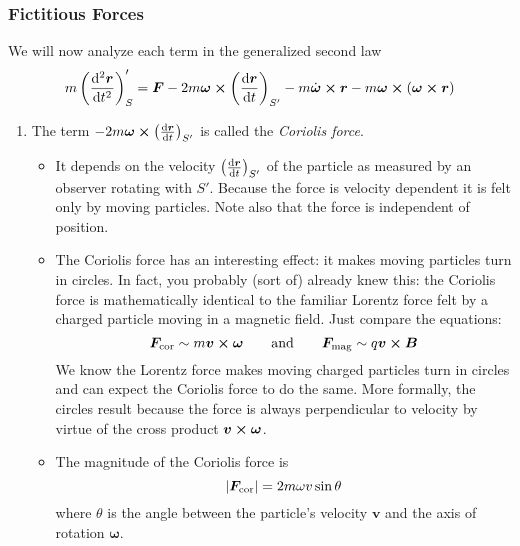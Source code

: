 \documentclass[11pt, a4paper]{article}
\newcommand{\eqtext}[1]{\qquad \text{#1} \qquad}
\newcommand{\bdot}[1]{\dot{\bm{#1}}} %
\begin{document}
\subsubsection{Fictitious Forces}
We will now analyze each term in the generalized second law
\begin{equation*}
	m\left(\dv[2]{\bm{r}}{t}\right)_{S}' = \bm{F} - 2m\bm{\omega} \cross  \left(\dv{\bm{r}}{t}\right)_{S'} - m\bdot{\omega} \cross \bm{r} - m\bm{\omega} \cross (\bm{\omega} \cross \bm{r})
\end{equation*}
\begin{enumerate}
	\item The term $ -2m \bm{\omega} \cross \left(\dv{\bm{r}}{t}\right)_{S'} $ is called the \textit{Coriolis force}.
	\begin{itemize}
		\item It depends on the velocity $ \left(\dv{\bm{r}}{t}\right)_{S'} $ of the particle as measured by an observer rotating with $ S' $. Because the force is velocity dependent it is felt only by moving particles. Note also that the force is independent of position.
		
		\item The Coriolis force has an interesting effect: it makes moving particles turn in circles. In fact, you probably (sort of) already knew this: the Coriolis force is mathematically identical to the familiar Lorentz force felt by a charged particle moving in a magnetic field. Just compare the equations:
		\begin{equation*}
			\bm{F}_{\text{cor}} \sim m \bm{v} \cross \bm{\omega} \eqtext{and} \bm{F}_{\text{mag}} \sim q \bm{v} \cross \bm{B}
		\end{equation*}
		We know the Lorentz force makes moving charged particles turn in circles and can expect the Coriolis force to do the same. More formally, the circles result because the force is always perpendicular to velocity by virtue of the cross product $ \bm{v} \cross \bm{\omega} $.
		
		\item The magnitude of the Coriolis force is
		\begin{equation*}
			\abs{\bm{F}_{\text{cor}}} = 2 m \omega v \sin \theta
		\end{equation*}
		where $ \theta $ is the angle between the particle's velocity $ \bm{v} $ and the axis of rotation $ \bm{\omega} $. 
		
	\end{itemize}
	

\end{enumerate}
\end{document}
